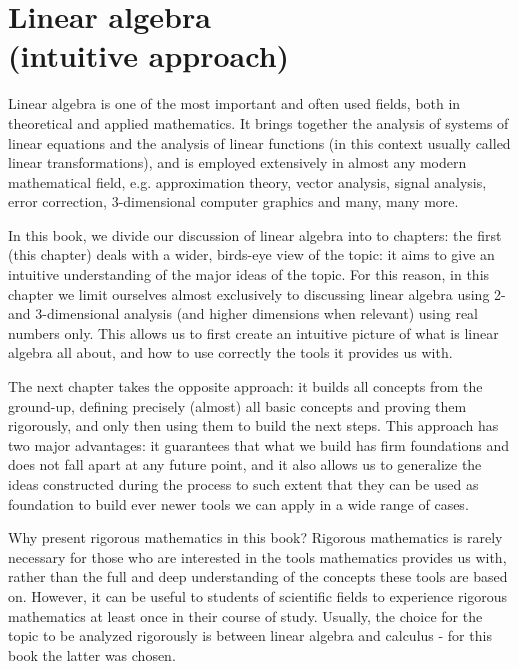 \chapter{Linear algebra\\(intuitive approach)}\label{chapter:linear algebra intuitive}
Linear algebra is one of the most important and often used fields, both in theoretical and applied mathematics. It brings together the analysis of systems of linear equations and the analysis of linear functions (in this context usually called linear transformations), and is employed extensively in almost any modern mathematical field, e.g. approximation theory, vector analysis, signal analysis, error correction, 3-dimensional computer graphics and many, many more.

In this book, we divide our discussion of linear algebra into to chapters: the first (this chapter) deals with a wider, birds-eye view of the topic: it aims to give an intuitive understanding of the major ideas of the topic. For this reason, in this chapter we limit ourselves almost exclusively to discussing linear algebra using 2- and 3-dimensional analysis (and higher dimensions when relevant) using real numbers only. This allows us to first create an intuitive picture of what is linear algebra all about, and how to use correctly the tools it provides us with.

The next chapter takes the opposite approach: it builds all concepts from the ground-up, defining precisely (almost) all basic concepts and proving them rigorously, and only then using them to build the next steps. This approach has two major advantages: it guarantees that what we build has firm foundations and does not fall apart at any future point, and it also allows us to generalize the ideas constructed during the process to such extent that they can be used as foundation to build ever newer tools we can apply in a wide range of cases.

\begin{note}{Why present rigorous mathematics in this book?}{ }
	Rigorous mathematics is rarely necessary for those who are interested in the tools mathematics provides us with, rather than the full and deep understanding of the concepts these tools are based on. However, it can be useful to students of scientific fields to experience rigorous mathematics at least once in their course of study. Usually, the choice for the topic to be analyzed rigorously is between linear algebra and calculus - for this book the latter was chosen.
\end{note}
